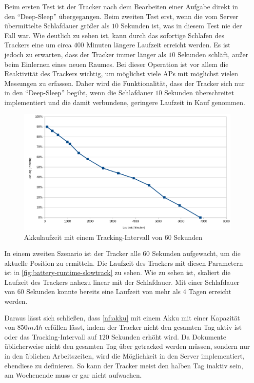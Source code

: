 Beim ersten Test ist der Tracker nach dem Bearbeiten einer Aufgabe direkt in den \enquote{Deep-Sleep}
übergegangen. Beim zweiten Test erst, wenn die vom Server übermittelte Schlafdauer größer als $10$
Sekunden ist, was in diesem Test nie der Fall war. Wie deutlich zu sehen ist, kann durch das
sofortige Schlafen des Trackers eine um circa $400$ Minuten längere Laufzeit erreicht werden. Es ist
jedoch zu erwarten, dass der Tracker immer länger als $10$ Sekunden schläft, außer beim Einlernen
eines neuen Raumes. Bei dieser Operation ist vor allem die Reaktivität des Trackers wichtig, um
möglichst viele \glspl{AP} mit möglichst vielen Messungen zu erfassen. Daher wird die
Funktionalität, dass der Tracker sich nur in den \enquote{Deep-Sleep} begibt, wenn die Schlafdauer
$10$ Sekunden überschreitet implementiert und die damit verbundene, geringere Laufzeit in Kauf
genommen.

\begin{figure}[htbp]
	\centering
	\includegraphics[width=.9\textwidth]{images/battery-runtime-slowtrack2.png}
	\caption{Akkulaufzeit mit einem Tracking-Intervall von 60 Sekunden}
	\label{fig:battery-runtime-slowtrack}
\end{figure}

In einem zweiten Szenario ist der Tracker alle $60$ Sekunden aufgewacht, um die aktuelle Position
zu ermitteln. Die Laufzeit des Trackers mit diesen Parametern ist in
\autoref{fig:battery-runtime-slowtrack} zu sehen. Wie zu sehen ist, skaliert die Laufzeit des
Trackers nahezu linear mit der Schlafdauer. Mit einer Schlafdauer von $60$ Sekunden konnte bereits
eine Laufzeit von mehr als 4 Tagen erreicht werden.

Daraus lässt sich schließen, dass \ref*{nf:akku} mit einem \gls{Akku} mit einer Kapazität von $850
mAh$ erfüllen lässt, indem der Tracker nicht den gesamten Tag aktiv ist oder das Tracking-Intervall
auf $120$ Sekunden erhöht wird. Da Dokumente üblicherweise nicht den gesamten Tag über getracked
werden müssen, sondern nur in den üblichen Arbeitszeiten, wird die Möglichkeit in den Server
implementiert, ebendiese zu definieren. So kann der Tracker meist den halben Tag inaktiv sein, am
Wochenende muss er gar nicht aufwachen.


